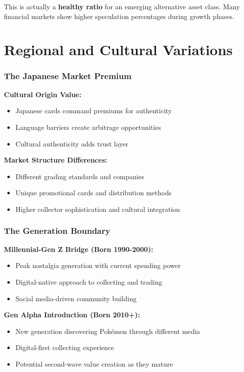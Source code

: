 \documentclass[11pt,oneside]{book}
\begin{document}
This is actually a \textbf{healthy ratio} for an emerging alternative asset class. Many financial markets show higher speculation percentages during growth phases.

\section{Regional and Cultural Variations}

\subsubsection{The Japanese Market Premium}

\textbf{Cultural Origin Value:}
\begin{itemize}
\item Japanese cards command premiums for authenticity
\item Language barriers create arbitrage opportunities
\item Cultural authenticity adds trust layer
\end{itemize}

\textbf{Market Structure Differences:}
\begin{itemize}
\item Different grading standards and companies
\item Unique promotional cards and distribution methods
\item Higher collector sophistication and cultural integration
\end{itemize}

\subsubsection{The Generation Boundary}

\textbf{Millennial-Gen Z Bridge (Born 1990-2000):}
\begin{itemize}
\item Peak nostalgia generation with current spending power
\item Digital-native approach to collecting and trading
\item Social media-driven community building
\end{itemize}

\textbf{Gen Alpha Introduction (Born 2010+):}
\begin{itemize}
\item New generation discovering Pokémon through different media
\item Digital-first collecting experience
\item Potential second-wave value creation as they mature
\end{itemize}
\end{document}
